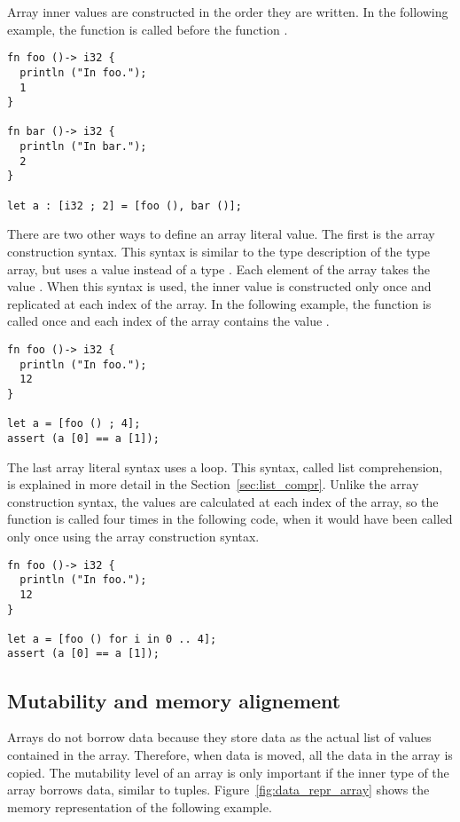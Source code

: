 Array inner values are constructed in the order they are written. In the
following example, the function  is called before the function
.

\begin{lstlisting}[style=coloredverbatim]
fn foo ()-> i32 {
  println ("In foo.");
  1
}

fn bar ()-> i32 {
  println ("In bar.");
  2
}

let a : [i32 ; 2] = [foo (), bar ()];
\end{lstlisting}

There are two other ways to define an array literal value. The first is the
array construction syntax. This syntax is similar to the type description of the
type array, but uses a value instead of a type \token{[V ; N]}. Each element of
the array takes the value . When this syntax is used, the inner value
is constructed only once and replicated at each index of the array. In the
following example, the function  is called once and each index of
the array contains the value .

\begin{lstlisting}[style=coloredverbatim]
fn foo ()-> i32 {
  println ("In foo.");
  12
}

let a = [foo () ; 4];
assert (a [0] == a [1]);
\end{lstlisting}

\smallskip
The last array literal syntax uses a  loop. This syntax, called list
comprehension, is explained in more detail in the Section~\ref{sec:list_compr}.
Unlike the array construction syntax, the values are calculated at each index of
the array, so the function is called four times in the following code, when it
would have been called only once using the array construction syntax.

\begin{lstlisting}[style=coloredverbatim]
fn foo ()-> i32 {
  println ("In foo.");
  12
}

let a = [foo () for i in 0 .. 4];
assert (a [0] == a [1]);
\end{lstlisting}


\subsection {Mutability and memory alignement}
Arrays do not borrow data because they store data as the actual list of values
contained in the array. Therefore, when data is moved, all the data in the array
is copied. The mutability level of an array is only important if the inner type
of the array borrows data, similar to tuples. Figure~\ref{fig:data_repr_array}
shows the memory representation of the following example.


